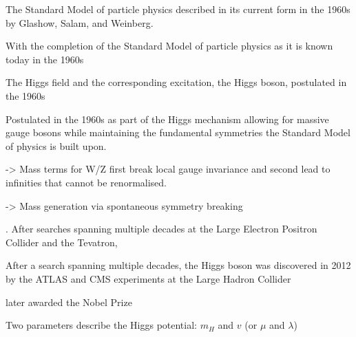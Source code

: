%
%
%
%
%







The Standard Model of particle physics described in its current form in the
1960s by Glashow, Salam, and Weinberg.


With the completion of the Standard Model of particle physics as it is known
today in the 1960s

The Higgs field and the corresponding excitation, the Higgs boson, postulated in
the 1960s

\cite{Englert:1964et,Higgs:1964pj}


Postulated in the 1960s as part of the Higgs mechanism allowing for massive
gauge bosons while maintaining the fundamental symmetries the Standard Model of
physics is built upon.


-> Mass terms for W/Z first break local gauge invariance and second lead to
infinities that cannot be renormalised.

-> Mass generation via spontaneous symmetry breaking


. After searches spanning multiple decades at the Large Electron
Positron Collider and the Tevatron,

After a search spanning multiple decades, the Higgs boson was discovered in 2012
by the ATLAS and CMS experiments at the Large Hadron Collider

later awarded the Nobel Prize


Two parameters describe the Higgs potential: $m_{H}$ and $v$ (or $\mu$ and
$\lambda$)


